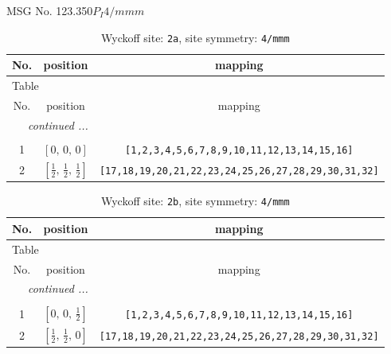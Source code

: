 \documentclass[fleqn,8pt]{jsarticle}
\begin{document}
\setcounter{MaxMatrixCols}{32}

\renewcommand{\tablename}{Table~}
\renewcommand{\figurename}{Figure~}
\begin{center}
\LARGE
MSG No. 123.350\quad$P_{I}4/mmm$
\end{center}
\renewcommand{\arraystretch}{1.2}
\begin{longtable}{ccc}
\caption{Wyckoff site: {\tt 2a}, site symmetry: {\tt 4/mmm}}
 \\
 \hline \hline
No. & position & mapping \\ \hline \endfirsthead

\multicolumn{2}{l}{\tablename\ \thetable{}} \\
 \hline \hline
No. & position & mapping \\ \hline \endhead

 \hline \hline
\multicolumn{2}{r}{\footnotesize\it continued ...} \\ \endfoot

 \hline \hline
\multicolumn{2}{r}{} \\ \endlastfoot

1 & $\left[ 0,\, 0,\, 0 \right]$ & {\tt [1,2,3,4,5,6,7,8,9,10,11,12,13,14,15,16]} \\ \hline
2 & $\left[ \frac{1}{2},\, \frac{1}{2},\, \frac{1}{2} \right]$ & {\tt [17,18,19,20,21,22,23,24,25,26,27,28,29,30,31,32]} \\
\end{longtable}
\renewcommand{\arraystretch}{1.2}
\begin{longtable}{ccc}
\caption{Wyckoff site: {\tt 2b}, site symmetry: {\tt 4/mmm}}
 \\
 \hline \hline
No. & position & mapping \\ \hline \endfirsthead

\multicolumn{2}{l}{\tablename\ \thetable{}} \\
 \hline \hline
No. & position & mapping \\ \hline \endhead

 \hline \hline
\multicolumn{2}{r}{\footnotesize\it continued ...} \\ \endfoot

 \hline \hline
\multicolumn{2}{r}{} \\ \endlastfoot

1 & $\left[ 0,\, 0,\, \frac{1}{2} \right]$ & {\tt [1,2,3,4,5,6,7,8,9,10,11,12,13,14,15,16]} \\ \hline
2 & $\left[ \frac{1}{2},\, \frac{1}{2},\, 0 \right]$ & {\tt [17,18,19,20,21,22,23,24,25,26,27,28,29,30,31,32]} \\
\end{longtable}
\end{document}
